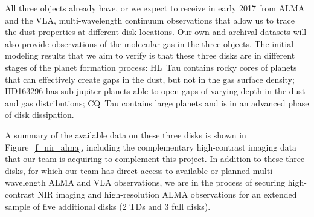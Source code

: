 \documentclass[10pt,fleqn,twoside]{article}
\begin{document}
All three objects already have, or we expect to receive in early 2017 from ALMA and the VLA, multi-wavelength continuum observations that allow us to trace the dust properties at different disk locations. Our own and archival datasets will also provide observations of the molecular gas in the three objects.
The initial modeling results that we aim to verify is that these three disks are in different stages of the planet formation process: HL~Tau contains rocky cores of planets that can effectively create gaps in the dust, but not in the gas surface density; HD163296 has sub-jupiter planets able to open gaps of varying depth in the dust and gas distributions; CQ~Tau contains large planets and is in an advanced phase of disk dissipation.

A summary of the available data on these three disks is shown in Figure~\ref{f_nir_alma}, including the complementary high-contrast imaging data that our team is acquiring to complement this project. In addition to these three disks, for which our team has direct access to available or planned multi-wavelength ALMA and VLA observations, we are in the process of securing high-contrast NIR imaging and high-resolution ALMA observations for an extended sample of five additional disks (2 TDs and 3 full disks).
\end{document}
